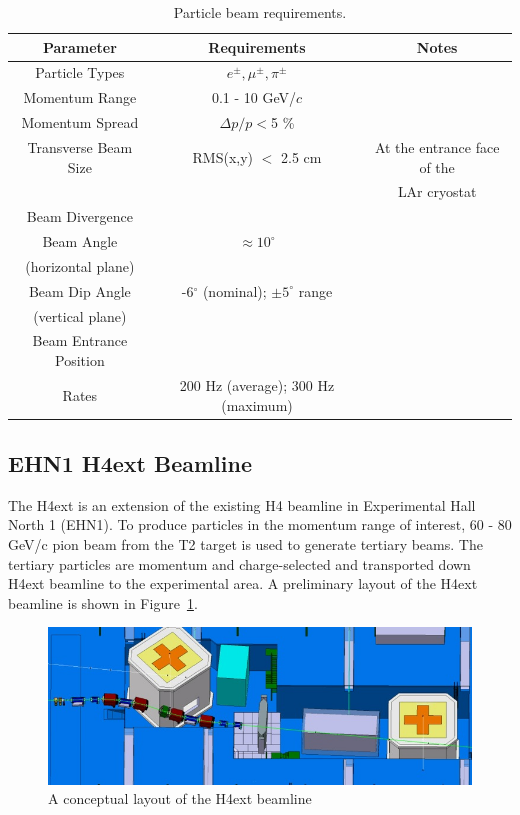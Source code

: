 \begin{table}[h]
\centering
\caption{Particle beam requirements.}
\label{table:beamspecs}
\begin{tabular}{|c|c|c|}
\hline
\textbf{Parameter } & \textbf{Requirements} & \textbf{Notes}  \\ \hline
  Particle Types        & $e^\pm,\mu^\pm,\pi^\pm$          &                   \\ \hline
  Momentum Range   & 0.1 - 10 GeV/$c$  &   \\ \hline
  Momentum Spread   & $\Delta p/p  < $5 \%  &   \\ \hline
  Transverse Beam Size   & RMS(x,y) $<$ 2.5 cm &  At the entrance face of the \\ 
                                              &                                        & LAr cryostat \\ \hline
  Beam Divergence &   &   \\ \hline
  Beam Angle &  $\approx10^{\circ}$  &   \\
  (horizontal plane) & & \\ \hline
  Beam Dip Angle &  -6$^\circ$ (nominal); $\pm5^\circ$ range &   \\ 
  (vertical plane) & & \\ \hline
  Beam Entrance Position &   &   \\ \hline
  Rates & 200 Hz (average); 300 Hz (maximum)  &   \\ \hline
\end{tabular}
\end{table}

\subsection{EHN1 H4ext Beamline}
The H4ext is an extension of the existing H4 beamline in Experimental Hall North 1 (EHN1).  To produce particles in the momentum range of interest, 60 - 80 GeV/c pion beam from the T2 target is used to generate tertiary beams. The tertiary particles are momentum and charge-selected and transported down H4ext beamline to the experimental area. A preliminary layout of the H4ext beamline is shown in Figure~\ref{fig:H4extPrelim}.

\begin{figure}[h]
  \centering
\includegraphics[scale=0.7]{figures/EHN1Ext_Prelim.jpg}
  \caption{A conceptual layout of the H4ext beamline  }
  \label{fig:H4extPrelim}
\end{figure}

